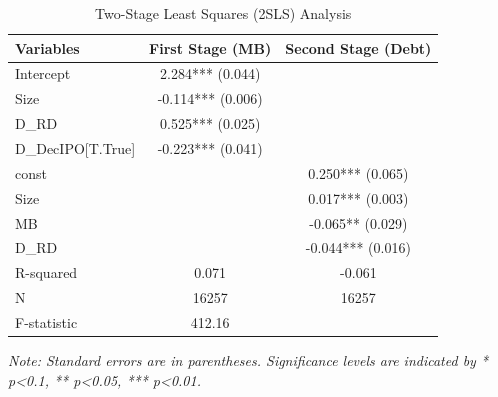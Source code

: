 \documentclass{article}
\begin{document}
\begin{table}[h!]
    \centering
    \caption{Two-Stage Least Squares (2SLS) Analysis}
    \label{table:4}
    \begin{tabular}{lcc}
        \toprule
        Variables         & First Stage (MB)  & Second Stage (Debt) \\
        \midrule
        Intercept         & 2.284*** (0.044)  &                     \\
        Size              & -0.114*** (0.006) &                     \\
        D\_RD             & 0.525*** (0.025)  &                     \\
        D\_DecIPO[T.True] & -0.223*** (0.041) &                     \\
        \midrule
        const             &                   & 0.250*** (0.065)    \\
        Size              &                   & 0.017*** (0.003)    \\
        MB                &                   & -0.065** (0.029)    \\
        D\_RD             &                   & -0.044*** (0.016)   \\
        \midrule
        R-squared         & 0.071             & -0.061              \\
        N                 & 16257             & 16257               \\
        F-statistic       & 412.16            &                     \\
        \bottomrule
    \end{tabular}
    \newline
    \textit{Note: Standard errors are in parentheses. Significance levels are indicated by * p\textless 0.1, ** p\textless 0.05, *** p\textless 0.01.}
\end{table}
\end{document}
